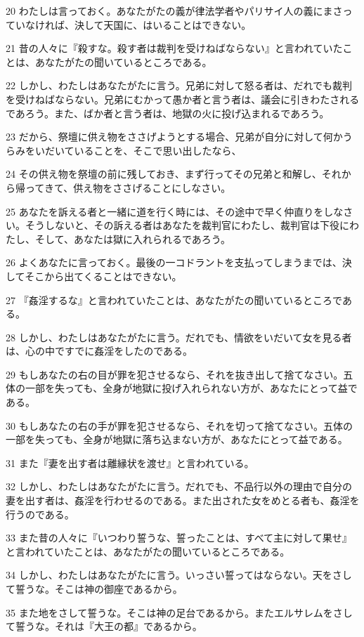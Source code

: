 \par 20 わたしは言っておく。あなたがたの義が律法学者やパリサイ人の義にまさっていなければ、決して天国に、はいることはできない。
\par 21 昔の人々に『殺すな。殺す者は裁判を受けねばならない』と言われていたことは、あなたがたの聞いているところである。
\par 22 しかし、わたしはあなたがたに言う。兄弟に対して怒る者は、だれでも裁判を受けねばならない。兄弟にむかって愚か者と言う者は、議会に引きわたされるであろう。また、ばか者と言う者は、地獄の火に投げ込まれるであろう。
\par 23 だから、祭壇に供え物をささげようとする場合、兄弟が自分に対して何かうらみをいだいていることを、そこで思い出したなら、
\par 24 その供え物を祭壇の前に残しておき、まず行ってその兄弟と和解し、それから帰ってきて、供え物をささげることにしなさい。
\par 25 あなたを訴える者と一緒に道を行く時には、その途中で早く仲直りをしなさい。そうしないと、その訴える者はあなたを裁判官にわたし、裁判官は下役にわたし、そして、あなたは獄に入れられるであろう。
\par 26 よくあなたに言っておく。最後の一コドラントを支払ってしまうまでは、決してそこから出てくることはできない。
\par 27 『姦淫するな』と言われていたことは、あなたがたの聞いているところである。
\par 28 しかし、わたしはあなたがたに言う。だれでも、情欲をいだいて女を見る者は、心の中ですでに姦淫をしたのである。
\par 29 もしあなたの右の目が罪を犯させるなら、それを抜き出して捨てなさい。五体の一部を失っても、全身が地獄に投げ入れられない方が、あなたにとって益である。
\par 30 もしあなたの右の手が罪を犯させるなら、それを切って捨てなさい。五体の一部を失っても、全身が地獄に落ち込まない方が、あなたにとって益である。
\par 31 また『妻を出す者は離縁状を渡せ』と言われている。
\par 32 しかし、わたしはあなたがたに言う。だれでも、不品行以外の理由で自分の妻を出す者は、姦淫を行わせるのである。また出された女をめとる者も、姦淫を行うのである。
\par 33 また昔の人々に『いつわり誓うな、誓ったことは、すべて主に対して果せ』と言われていたことは、あなたがたの聞いているところである。
\par 34 しかし、わたしはあなたがたに言う。いっさい誓ってはならない。天をさして誓うな。そこは神の御座であるから。
\par 35 また地をさして誓うな。そこは神の足台であるから。またエルサレムをさして誓うな。それは『大王の都』であるから。
